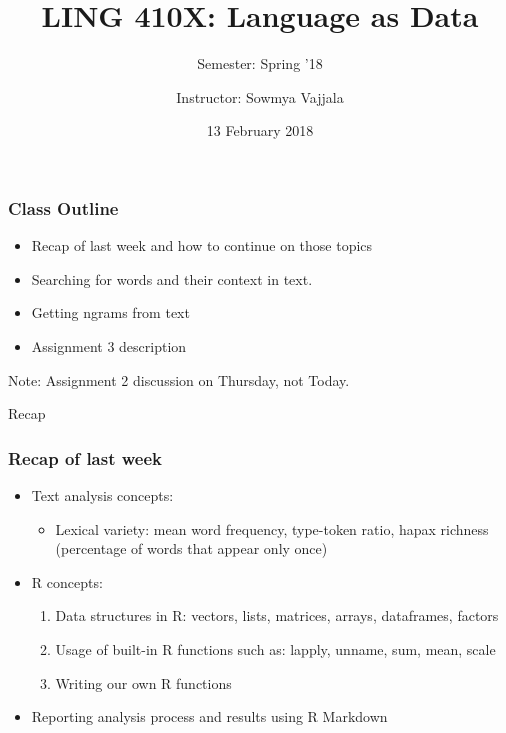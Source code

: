 \documentclass{beamer}
\author[Sowmya Vajjala]{Instructor: Sowmya Vajjala}
\title[LING 410X]{LING 410X: Language as Data}
\subtitle{Semester: Spring '18}
\date{13 February 2018}
\institute{Iowa State University, USA}
\begin{document}
\begin{frame}\titlepage
\end{frame}

\begin{frame}
\frametitle{Class Outline}
\begin{itemize}
\item Recap of last week and how to continue on those topics
\item Searching for words and their context in text. 
\item Getting ngrams from text
\item Assignment 3 description
\end{itemize}
Note: Assignment 2 discussion on Thursday, not Today.
\end{frame}

\begin{frame}
\Large Recap
\end{frame}

\begin{frame}
\frametitle{Recap of last week}
\begin{itemize}
\item Text analysis concepts:
\begin{itemize}
\item Lexical variety: mean word frequency, type-token ratio, hapax richness (percentage of words that appear only once)
\end{itemize} \pause
\item R concepts:
\begin{enumerate}
\item Data structures in R: vectors, lists, matrices, arrays, dataframes, factors \pause
\item Usage of built-in R functions such as: lapply, unname, sum, mean, scale \pause
\item Writing our own R functions \pause
\end{enumerate}
\item Reporting analysis process and results using R Markdown
\end{itemize}
\end{frame}
\end{document}
